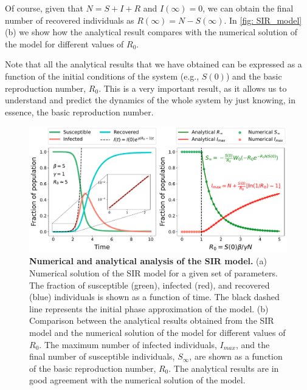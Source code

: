 Of course, given that $N=S+I+R$ and $I(\infty)=0$, we can obtain the final
number of recovered individuals as $R(\infty)=N-S(\infty)$. In \cref{fig:
  SIR_model}(b) we show how the analytical result compares with the numerical
solution of the model for different values of $R_0$.

\begin{remark}
  Note that all the analytical results that we have obtained can be expressed
  as a function of the initial conditions of the system (e.g., $S(0)$) and the
  basic reproduction number, $R_0$. This is a very important result, as it
  allows us to understand and predict the dynamics of the whole system by just
  knowing, in essence, the basic reproduction number.
\end{remark}


\begin{figure}[H]
  \centering
  \includegraphics[width=1\textwidth]{Figures/SIR_model_analysis.pdf}
  \caption[Numerical and analytical analysis of the SIR model.]{\label{fig:
      SIR_model} \textbf{Numerical and analytical analysis of the SIR model.}
    (a) Numerical solution of the SIR model for a given set of parameters. The
    fraction of susceptible (green), infected (red), and recovered (blue)
    individuals is shown as a function of time. The black dashed line
    represents the initial phase approximation of the model. (b) Comparison
    between the analytical results obtained from the SIR model and the
    numerical solution of the model for different values of $R_0$. The maximum
    number of infected individuals, $I_{max}$, and the final number of
    susceptible individuals, $S_{\infty}$, are shown as a function of the basic
    reproduction number, $R_0$. The analytical results are in good agreement
    with the numerical solution of the model.
  }
\end{figure}

